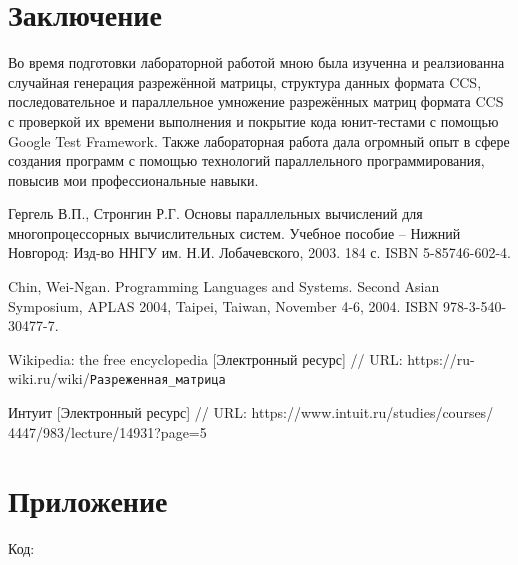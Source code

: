 \documentclass{report}
\begin{document}
\section*{Заключение}
Во время подготовки лабораторной работой мною была изученна и реалзиованна случайная генерация разрежённой матрицы, структура данных формата CCS, последовательное и параллельное умножение разрежённых матриц формата CCS с проверкой их времени выполнения и покрытие кода юнит-тестами с помощью Google Test Framework. Также лабораторная работа дала огромный опыт в сфере создания программ с помощью технологий параллельного программирования, повысив мои профессиональные навыки.

\newpage

\begin{thebibliography}{99}
	 Гергель В.П., Стронгин Р.Г. Основы параллельных вычислений для многопроцессорных вычислительных систем. Учебное пособие – Нижний Новгород: Изд-во ННГУ им. Н.И. Лобачевского, 2003. 184 с. ISBN 5-85746-602-4.
	
	 Chin, Wei-Ngan. Programming Languages and Systems. Second Asian Symposium, APLAS 2004, Taipei, Taiwan, November 4-6, 2004. ISBN 978-3-540-30477-7.
	
	 Wikipedia: the free encyclopedia [Электронный ресурс] // URL: https://ru-wiki.ru/wiki/\verb|Разреженная_матрица| 
	
	 Интуит [Электронный ресурс] // URL:  https://www.intuit.ru/studies/courses/\\4447/983/lecture/14931?page=5 
\end{thebibliography}
\newpage

\section*{Приложение}

Код:








\end{document}

